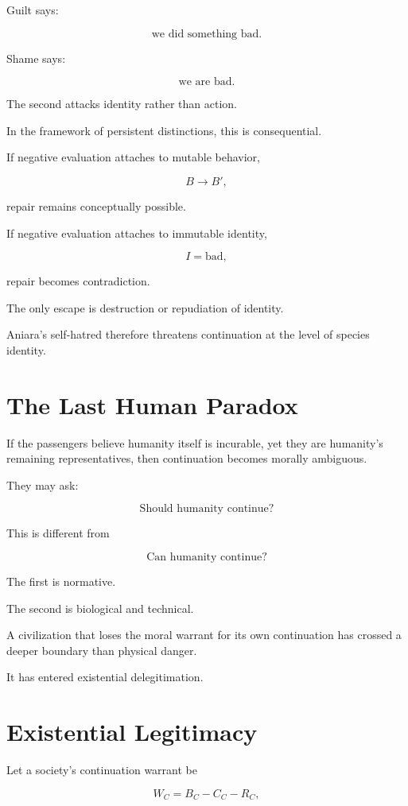 \documentclass[11pt,oneside]{book}
\theoremstyle{definition}
\theoremstyle{remark}
\begin{document}
Guilt says:

\[
\text{we did something bad}.
\]

Shame says:

\[
\text{we are bad}.
\]

The second attacks identity rather than action.

In the framework of persistent distinctions, this is consequential.

If negative evaluation attaches to mutable behavior,

\[
B\rightarrow B',
\]

repair remains conceptually possible.

If negative evaluation attaches to immutable identity,

\[
I=\text{bad},
\]

repair becomes contradiction.

The only escape is destruction or repudiation of identity.

Aniara's self-hatred therefore threatens continuation at the level of species identity.

\section{The Last Human Paradox}

If the passengers believe humanity itself is incurable, yet they are humanity's remaining representatives, then continuation becomes morally ambiguous.

They may ask:

\[
\text{Should humanity continue?}
\]

This is different from

\[
\text{Can humanity continue?}
\]

The first is normative.

The second is biological and technical.

A civilization that loses the moral warrant for its own continuation has crossed a deeper boundary than physical danger.

It has entered existential delegitimation.

\section{Existential Legitimacy}

Let a society's continuation warrant be

\[
W_C
=
B_C-C_C-R_C,
\]
\end{document}
